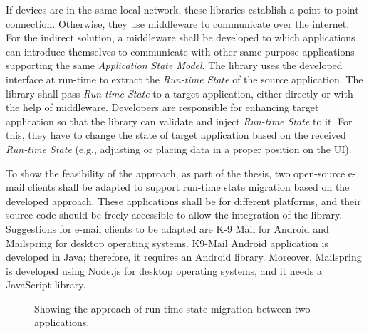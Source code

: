 If devices are in the same local network, these libraries establish a point-to-point connection. Otherwise, they use middleware to communicate over the internet.
For the indirect solution, a middleware shall be developed to which applications can introduce themselves to communicate with other same-purpose applications supporting the same \textit{Application State Model}. 
The library uses the developed interface at run-time to extract the \textit{Run-time State} of the source application. The library shall pass \textit{Run-time State} to a target application, either directly or with the help of middleware. 
Developers are responsible for enhancing target application so that the library can validate and inject \textit{Run-time State} to it. 
For this, they have to change the state of target application based on the received \textit{Run-time State} (e.g., adjusting or placing data in a proper position on the UI). 

To show the feasibility of the approach, as part of the thesis, two open-source e-mail clients shall be adapted to support run-time state migration based on the developed approach. These applications shall be for different platforms, and their source code should be freely accessible to allow the integration of the library.
Suggestions for e-mail clients to be adapted are K-9 Mail for Android and Mailspring for desktop operating systems.
K9-Mail Android application is developed in Java; therefore, it requires an Android library. Moreover, Mailspring is developed using Node.js for desktop operating systems, and it needs a JavaScript library.

\FloatBarrier
\begin{figure}[!b]
    
    \caption{Showing the approach of run-time state migration between two applications.}
    \label{fig:solution}
\end{figure}
\FloatBarrier
